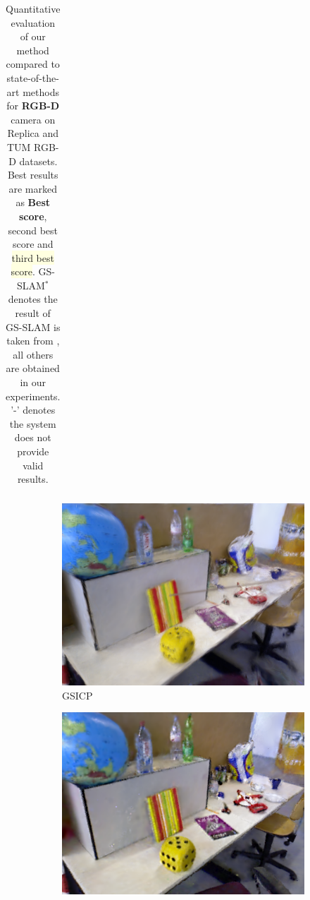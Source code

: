 \begin{table}
\begin{tabular}{@{}l|ccc|ccc|ccc}
    \hline
  \end{tabular}
  \caption{Quantitative evaluation of our method compared to state-of-the-art methods for {\bf RGB-D} camera on Replica and TUM RGB-D datasets. Best results are marked as  \colorbox{lightred}{\bf Best score}, \colorbox{lightorange}{second best score} and \colorbox{lightyellow}{third best score}. GS-SLAM$^*$ denotes the result of GS-SLAM is taken from \cite{GS-SLAM2024}, all others are obtained in our experiments. '-' denotes the system does not provide valid results.}
  \label{tab:rendering_rgbd}
\end{table}

\begin{figure}[ht]
	\centering
    \begin{subfigure}[t]{0.19\linewidth}
        \includegraphics[width=1\linewidth]{fig/fig_rgbd/tum/fr3/GS-ICP/00213.png}
        \caption{GSICP \cite{GS-ICPSLAM2024}}
        \label{fig:gull}
    \end{subfigure}
    \begin{subfigure}[t]{0.19\linewidth}
        \includegraphics[width=1\linewidth]{fig/fig_rgbd/tum/fr3/SplaTAM/00213.png}

\end{subfigure}
\end{figure}
